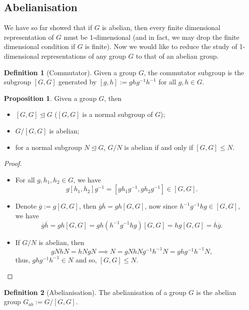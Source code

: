 \documentclass[]{article}
\theoremstyle{definition}
\theoremstyle{definition}
\newtheorem{definition}{Definition}[section]
\newtheorem{proposition}{Proposition}[section]
\begin{document}
\subsection{Abelianisation}

We have so far showed that if \(G\) is abelian, then every finite dimensional 
representation of \(G\) must be 1-dimensional (and in fact, we may drop the 
finite dimensional condition if \(G\) is finite). Now we would like to reduce 
the study of 1-dimensional representations of any group \(G\) to that of an 
abelian group. 

\begin{definition}[Commutator]
  Given a group \(G\), the commutator subgroup is the subgroup \([G, G]\) 
  generated by \([g, h] := ghg^{-1}h^{-1}\) for all \(g, h \in G\).
\end{definition}

\begin{proposition}
  Given a group \(G\), then
  \begin{itemize}
    \item \([G, G] \trianglelefteq G\) (\([G, G]\) is a normal subgroup of \(G\));
    \item \(G / [G, G]\) is abelian;
    \item for a normal subgroup \(N \trianglelefteq G\), \(G / N\) is abelian if 
      and only if \([G, G] \le N\).
  \end{itemize}
\end{proposition}
\begin{proof}
  \hphantom{a}
  \begin{itemize}
    \item For all \(g, h_1, h_2 \in G\), we have 
      \[g [h_1, h_2] g^{-1} = [gh_1 g^{-1}, gh_2 g^{-1}] \in [G, G].\]
    \item Denote \(\overline{g} := g[G, G]\), then 
      \(\overline{g}\overline{h} = gh[G, G]\),
      now since \(h^{-1}g^{-1}hg \in [G, G]\), we have 
      \[\overline{g}\overline{h} = gh[G, G] = gh(h^{-1}g^{-1}hg)[G, G] = 
        hg[G, G] = \overline{h}\overline{g}.\]
    \item If \(G / N\) is abelian, then 
      \[gNhN = hNgN \implies N = gNhNg^{-1}h^{-1}N = ghg^{-1}h^{-1}N,\]
      thus, \(ghg^{-1}h^{-1} \in N\) and so, \([G, G] \le N\).
  \end{itemize}
\end{proof}

\begin{definition}[Abelianisation]
  The abelianisation of a group \(G\) is the abelian group \(G_{ab} := G / [G, G]\).
\end{definition}
\end{document}
